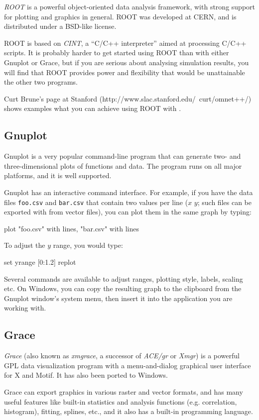 \textit{ROOT} is a powerful object-oriented data analysis framework,
with strong support for plotting and graphics in general.
ROOT was developed at CERN, and is distributed under a BSD-like license.

ROOT is based on \textit{CINT}, a ``C/C++ interpreter''
aimed at processing C/C++ scripts. It is probably harder to get started
using ROOT than with either Gnuplot or Grace, but if you are serious
about analysing simulation results, you will find that ROOT provides
power and flexibility that would be unattainable the other two programs.

Curt Brune's page at Stanford (http://www.slac.stanford.edu/~curt/omnet++/)
shows examples what you can achieve using ROOT with {\opp}.


\subsection{Gnuplot}
\label{sec:ana-sim:gnuplot}

Gnuplot is a very popular command-line program that can generate two-
and three-dimensional plots of functions and data. The program runs
on all major platforms, and it is well supported.

Gnuplot has an interactive command interface. For example, if you have
the data files \texttt{foo.csv} and \texttt{bar.csv} that contain
two values per line ($x$ $y$; such files can be exported with
 from vector files), you can plot them in the same
graph by typing:

\begin{commandline}
plot "foo.csv" with lines, "bar.csv" with lines
\end{commandline}

To adjust the $y$ range, you would type:

\begin{commandline}
set yrange [0:1.2]
replot
\end{commandline}

Several commands are available to adjust ranges, plotting style, labels,
scaling etc. On Windows, you can copy the resulting graph to the clipboard from
the Gnuplot window's system menu, then insert it into the application you
are working with.


\subsection{Grace}

\textit{Grace} (also known as \textit{xmgrace}, a successor of
\textit{ACE/gr} or \textit{Xmgr}) is a powerful GPL data visualization
program with a menu-and-dialog graphical user interface for X and Motif. It
has also been ported to Windows.

Grace can export graphics in various raster and vector formats, and has
many useful features like built-in statistics and analysis functions (e.g.
correlation, histogram), fitting, splines, etc., and it also has a built-in
programming language.




